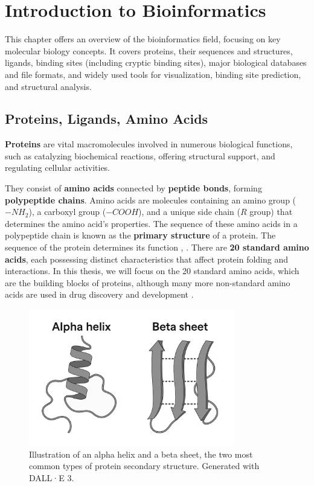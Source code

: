 \chapter{Introduction to Bioinformatics}
\label{chap:intro}

This chapter offers an overview of the bioinformatics field, focusing on key molecular biology concepts. It covers proteins, their sequences and structures, ligands, binding sites (including cryptic binding sites), major biological databases and file formats, and widely used tools for visualization, binding site prediction, and structural analysis.

\section{Proteins, Ligands, Amino Acids}
\label{sec:proteins}

\textbf{Proteins} are vital macromolecules involved in numerous biological functions, such as catalyzing biochemical reactions, offering structural support, and regulating cellular activities.

They consist of \textbf{amino acids} connected by \textbf{peptide bonds}, forming \textbf{polypeptide chains}. Amino acids are molecules containing an amino group (\(-NH_2\)), a carboxyl group (\(-COOH\)), and a unique side chain (\(R\) group) that determines the amino acid's properties. The sequence of these amino acids in a polypeptide chain is known as the \textbf{primary structure} of a protein. The sequence of the protein determines its function \cite{nelson2008lehninger}, \cite{voet2010biochemistry}. There are \textbf{20 standard amino acids}, each possessing distinct characteristics that affect protein folding and interactions. In this thesis, we will focus on the 20 standard amino acids, which are the building blocks of proteins, although many more non-standard amino acids are used in drug discovery and development \cite{dumas2015designing}.

\begin{figure}[ht]
    \centering
    \includegraphics[width=0.8\textwidth]{img/ah_bs.png}
    \caption{Illustration of an alpha helix and a beta sheet, the two most common types of protein secondary structure. Generated with DALL·E 3.}
    \label{fig:alpha-beta}
\end{figure}

